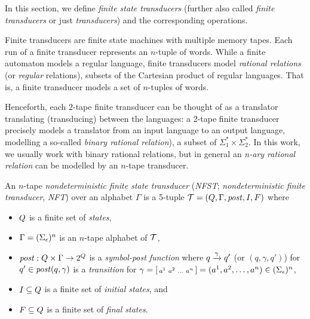 In this section, we define \emph{finite state transducers} (further also called \emph{finite transducers} or just \emph{transducers}) and the corresponding operations.

Finite transducers are finite state machines with multiple memory tapes.
Each run of a finite transducer represents an $n$-tuple of words.
While a finite automaton models a regular language,
finite transducers model \emph{rational relations} (or \emph{regular} relations), subsets of the Cartesian product of regular languages.
That is, a finite transducer models a set of $n$-tuples of words.

Henceforth, each $2$-tape finite transducer can be thought of as a translator translating (transducing) between the languages: a 2-tape finite transducer precisely models a translator from an input language to an output language, modelling a so-called \emph{binary rational relation}), a subset of $\Sigma_1^* \times \Sigma_2^*$.
In this work, we usually work with binary rational relations, but in general an \emph{n-ary rational relation} can be modelled by an $n$-tape transducer.

\begin{definition} \hfill \newline
An $n$-tape \emph{nondeterministic finite state transducer} (\emph{NFST}; \emph{nondeterministic finite transducer}, \emph{NFT}) over an alphabet $\Gamma$ is a 5-tuple $\mathcal{T} = (Q, \Gamma, \mathit{post}, I, F)$ where
\begin{itemize}
    \item $Q$ is a finite set of \emph{states},
    \item $\Gamma = (\Sigma_\epsilon)^n$ is an $n$-tape alphabet of $\mathcal{T}$,
    \item $\mathit{post}: Q \times \Gamma \rightarrow 2^{Q}$ is a \emph{symbol-post function}
    where ${q} \xrightarrow{{\gamma}} {q'}$ (or $(q, \gamma, q')$) for
    \\$q' \in \mathit{post}(q, \gamma)$ is a \emph{transition} for $\gamma = \begin{bsmallmatrix} a^1 & a^2 & \ldots & a^n\end{bsmallmatrix} = (a^1, a^2, \ldots, a^n) \in (\Sigma_\epsilon)^n$,
    \item $I \subseteq Q$ is a finite set of \emph{initial states}, and
    \item $F \subseteq Q$ is a finite set of \emph{final states}.
\end{itemize}
\end{definition}

